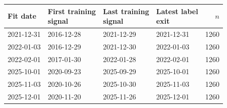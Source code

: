 \begin{tabular}{@{}llllr@{}}
\toprule
Fit date & \shortstack{First training\\signal} & \shortstack{Last training\\signal} & \shortstack{Latest label\\exit} & $n$ \\
\midrule
2021-12-31 & 2016-12-28 & 2021-12-29 & 2021-12-31 & 1260 \\
2022-01-03 & 2016-12-29 & 2021-12-30 & 2022-01-03 & 1260 \\
2022-02-01 & 2017-01-30 & 2022-01-28 & 2022-02-01 & 1260 \\
2025-10-01 & 2020-09-23 & 2025-09-29 & 2025-10-01 & 1260 \\
2025-11-03 & 2020-10-26 & 2025-10-30 & 2025-11-03 & 1260 \\
2025-12-01 & 2020-11-20 & 2025-11-26 & 2025-12-01 & 1260 \\
\bottomrule
\end{tabular}
